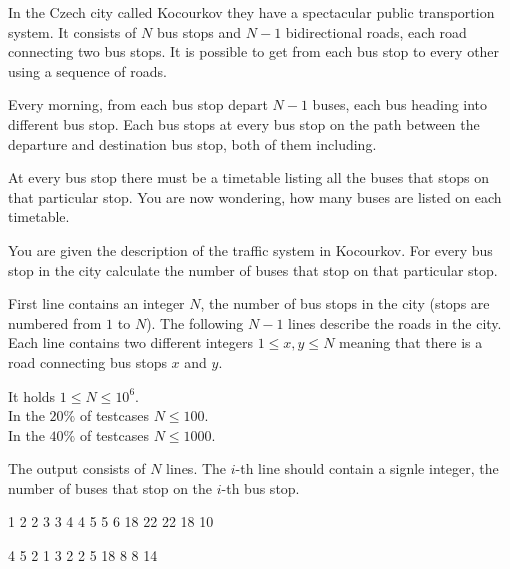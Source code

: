 





In the Czech city called Kocourkov they have a spectacular public transportion system.
It consists of $N$ bus stops and $N-1$ bidirectional roads, each road connecting two bus stops.
It is possible to get from each bus stop to every other using a sequence of roads.

Every morning, from each bus stop depart $N-1$ buses, each bus heading into different bus stop.
Each bus stops at every bus stop on the path between the departure and destination bus stop, both of them including.

At every bus stop there must be a timetable listing all the buses that stops on that particular stop.
You are now wondering, how many buses are listed on each timetable.


You are given the description of the traffic system in Kocourkov.
For every bus stop in the city calculate the number of buses that stop on that particular stop.


First line contains an integer $N$, the number of bus stops in the city (stops are numbered from $1$ to $N$).
The following $N-1$ lines describe the roads in the city.
Each line contains two different integers $1 \le x, y \le N$ meaning that there is a road connecting bus stops $x$ and $y$.

\bigskip
\noindent
It holds $1 \leq N \leq 10^6$.\\
In the $20\%$ of testcases $N \leq 100$.\\
In the $40\%$ of testcases $N \leq 1000$.


The output consists of $N$ lines. The $i$-th line should contain a signle integer, the number of buses that stop on the $i$-th bus stop.


1 2
2 3
3 4
4 5
5 6
18
22
22
18
10
\sampleEND

\bigskip

4 5
2 1
3 2
2 5
18
8
8
14
\sampleEND


